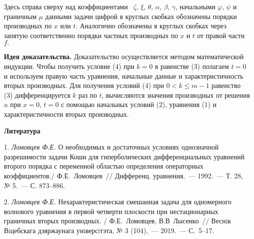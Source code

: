  Здесь справа сверху над коэффициентами ~$\zeta,\, \xi,\,
\theta,\, \alpha,\, \beta,\, \gamma$, начальными $\varphi,\,\psi$
и граничным $\mu$ данными задачи цифрой в круглых скобках
обозначены порядки производных по $x$ или $t.$ Аналогично
обозначены в круглых скобках через запятую соответственно порядки
частных производных по $x$ и $t$ от правой части $f.$

{\bf Идея доказательства.} Доказательство осуществляется методом
математической индукции.  Чтобы получить условие (4) при $k=0$ в
равенстве (3) полагаем $t=0$ и используем правую часть уравнения,
начальные данные и характеристичность вторых производных. Для
получения условий (4) при $0<k\leq m-1$ равенство (3)
дифференцируется $k$ раз по $t$, вычисляются значения производных
от решения $u$ при $x=0, \, t=0$ с помощью начальных условий (2),
уравнения (1) и характеристичности вторых производных.


\smallskip \centerline{\bf Литература}\nopagebreak

1. \textit{Ломовцев Ф.Е.}  {О необходимых и достаточных условиях
однозначной разрешимости задачи Коши для гиперболических
дифференциальных уравнений второго порядка с переменной областью
определения операторных коэффициентов./ Ф.Е.~Ломовцев~//
Дифференц. уравнения.~--- 1992.~--- Т. 28, № 5.~--- С. 873--886.}


2. \textit{Ломовцев Ф.Е.} {Нехарактеристическая смешанная задача
для одномерного волнового уравнения в первой четверти плоскости
при нестационарных граничных вторых производных. / Ф.Е.~Ломовцев,
В.В~Лысенко~// Веснiк Вiцебскага дзяржаунага унiверсiтэта, № 3
(104),~--- 2019.~--- С.~5--17.}





